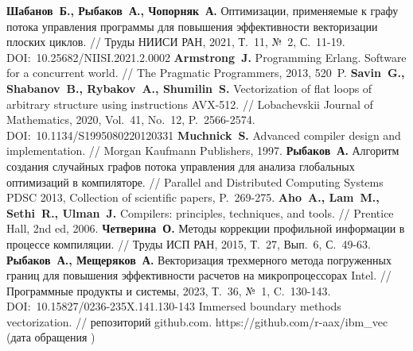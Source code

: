 \begin{thebibliography}{99}
\textbf{Шабанов~Б., Рыбаков~А., Чопорняк~А.} Оптимизации, применяемые к графу потока управления программы для повышения эффективности векторизации плоских циклов. // Труды НИИСИ РАН, 2021, Т.~11, №~2, С.~11-19. DOI:~10.25682/NIISI.2021.2.0002
\textbf{Armstrong~J.} Programming Erlang. Software for a concurrent world. // The Pragmatic Programmers, 2013, 520~P.
\textbf{Savin~G., Shabanov~B., Rybakov~A., Shumilin~S.} Vectorization of flat loops of arbitrary structure using instructions AVX-512. // Lobachevskii Journal of Mathematics, 2020, Vol.~41, No.~12, P.~2566-2574. DOI:~10.1134/S1995080220120331
\textbf{Muchnick~S.} Advanced compiler design and implementation. // Morgan Kaufmann Publishers, 1997.
\textbf{Рыбаков~А.} Алгоритм создания случайных графов потока управления для анализа глобальных оптимизаций в компиляторе. // Parallel and Distributed Computing Systems PDSC 2013, Collection of scientific papers, P.~269-275.
\textbf{Aho~A., Lam~M., Sethi~R., Ulman~J.} Compilers: principles, techniques, and tools. // Prentice Hall, 2nd ed, 2006.
\textbf{Четверина~О.} Методы коррекции профильной информации в процессе компиляции. // Труды ИСП РАН, 2015, Т.~27, Вып.~6, С.~49-63.
\textbf{Рыбаков~А., Мещеряков~А.} Векторизация трехмерного метода погруженных границ для повышения эффективности расчетов на микропроцессорах Intel. // Программные продукты и системы, 2023, Т.~36, №~1, C.~130-143. DOI:~10.15827/0236-235X.141.130-143
Immersed boundary methods vectorization. // репозиторий github.com. https://github.com/r-aax/ibm\_vec (дата обращения \StrDate)


\end{thebibliography}
